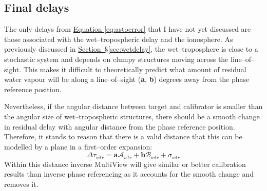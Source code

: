 
\subsection{Final delays}
		The only delays from \hyperref[eq:astoerror]{Equation \ref*{eq:astoerror}} that I have not yet discussed are those associated with the wet--tropospheric delay and the ionosphere. As previously discussed in \hyperref[sec:wetdelay]{Section~\S\ref*{sec:wetdelay}}, the wet--troposphere is close to a stochastic system and depends on clumpy structures moving across the line--of--sight. This makes it difficult to theoretically predict what amount of residual water vapour will be along a line--of--sight (\textbf{a}, \textbf{b}) degrees away from the phase reference position.
		
		Nevertheless, if the angular distance between target and calibrator is smaller than the angular size of wet--tropospheric structures, there should be a smooth change in residual delay with angular distance from the phase reference position. Therefore, it stands to reason that there is a valid distance that this can be modelled by a plane in a first--order expansion:
		\begin{equation}
		\Delta\tau_{wtr} = \textbf{a}\mathcal{A}_{wtr} + \textbf{b}\mathcal{B}_{wtr} + \sigma_{wtr}
		\end{equation} 
		Within this distance inverse MultiView will give similar or better calibration results than inverse phase referencing as it accounts for the smooth change and removes it.
		
